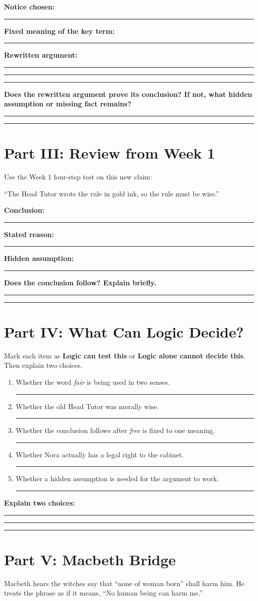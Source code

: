 \documentclass[12pt]{article}
\newcommand{\focusbox}[1]{\par\vspace{0.35em}\noindent\begingroup\setlength{\fboxsep}{6pt}\colorbox{gray!12}{\begin{minipage}{\dimexpr\linewidth-2\fboxsep\relax}#1\end{minipage}}\endgroup\par\vspace{0.45em}}
\newcommand{\studentline}{\par\vspace{0.60em}\hrule\vspace{0.64em}}
\newcommand{\shortline}{\par\vspace{0.38em}\hrule\vspace{0.48em}}
\begin{document}
\textbf{Notice chosen:} \rule{1.8in}{0.4pt}

\textbf{Fixed meaning of the key term:}\studentline
\textbf{Rewritten argument:}\studentline\studentline\studentline
\textbf{Does the rewritten argument prove its conclusion? If not, what hidden assumption or missing fact remains?}\studentline\studentline

\Needspace{0.42\textheight}
\section*{Part III: Review from Week 1}
Use the Week 1 four-step test on this new claim:

\focusbox{``The Head Tutor wrote the rule in gold ink, so the rule must be wise.''}

\textbf{Conclusion:}\shortline
\textbf{Stated reason:}\shortline
\textbf{Hidden assumption:}\shortline
\textbf{Does the conclusion follow? Explain briefly.}\studentline\studentline

\Needspace{0.38\textheight}
\section*{Part IV: What Can Logic Decide?}
Mark each item as \textbf{Logic can test this} or \textbf{Logic alone cannot decide this}. Then explain two choices.

\begin{enumerate}[leftmargin=*]
\item Whether the word \textit{fair} is being used in two senses. \hfill \rule{2.25in}{0.4pt}
\item Whether the old Head Tutor was morally wise. \hfill \rule{2.25in}{0.4pt}
\item Whether the conclusion follows after \textit{free} is fixed to one meaning. \hfill \rule{2.25in}{0.4pt}
\item Whether Nora actually has a legal right to the cabinet. \hfill \rule{2.25in}{0.4pt}
\item Whether a hidden assumption is needed for the argument to work. \hfill \rule{2.25in}{0.4pt}
\end{enumerate}

\textbf{Explain two choices:}\studentline\studentline\studentline

\Needspace{0.46\textheight}
\section*{Part V: Macbeth Bridge}
Macbeth hears the witches say that ``none of woman born'' shall harm him. He treats the phrase as if it means, ``No human being can harm me.''
\end{document}
